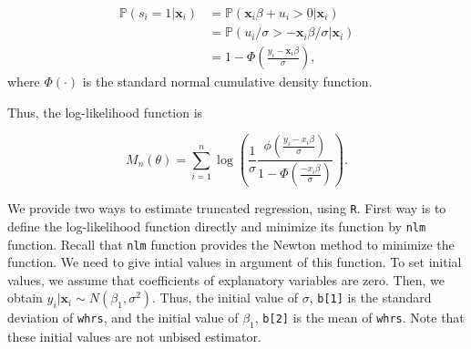 \documentclass[
  12pt,
]{article}
\begin{document}
\begin{align*}
  \mathbb{P}(s_i = 1 | \mathbf{x}_i) 
  &= \mathbb{P}(\mathbf{x}_i \beta + u_i > 0| \mathbf{x}_i)  \\
  &= \mathbb{P}(u_i/\sigma > -\mathbf{x}_i \beta/\sigma| \mathbf{x}_i)  \\
  &= 1 - \Phi \left( \frac{y_i - \mathbf{x}_i \beta}{\sigma} \right),
\end{align*} where \(\Phi(\cdot)\) is the standard normal cumulative
density function.

Thus, the log-likelihood function is

\begin{equation*}
  M_n(\theta) 
  = \sum_{i=1}^n \log \left( \frac{1}{\sigma} \frac{\phi(\frac{y_i - x_i \beta}{\sigma})}{1 - \Phi(\frac{- x_i \beta}{\sigma})} \right).
\end{equation*}

We provide two ways to estimate truncated regression, using \texttt{R}.
First way is to define the log-likelihood function directly and minimize
its function by \texttt{nlm} function. Recall that \texttt{nlm} function
provides the Newton method to minimize the function. We need to give
intial values in argument of this function. To set initial values, we
assume that coefficients of explanatory variables are zero. Then, we
obtain \(y_i | \mathbf{x}_i \sim N(\beta_1, \sigma^2)\). Thus, the
initial value of \(\sigma\), \texttt{b{[}1{]}} is the standard deviation
of \texttt{whrs}, and the initial value of \(\beta_1\),
\texttt{b{[}2{]}} is the mean of \texttt{whrs}. Note that these initial
values are not unbised estimator.
\end{document}
